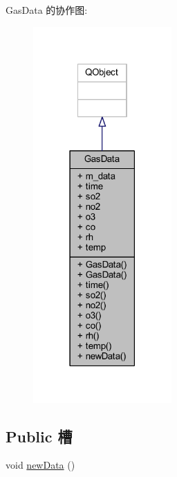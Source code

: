 Gas\+Data 的协作图\+:
\nopagebreak
\begin{figure}[H]
\begin{center}
\leavevmode
\includegraphics[width=150pt]{class_gas_data__coll__graph}
\end{center}
\end{figure}
\subsection*{Public 槽}
\begin{DoxyCompactItemize}
\item 
void \hyperlink{class_gas_data_a3f73b70a55cf1f7b39099500cacb9e13}{new\+Data} ()
\end{DoxyCompactItemize}
